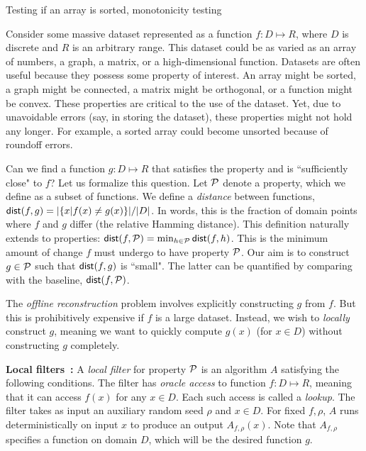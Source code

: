 \documentclass[natbib]{svcyclop}
\def\dist{{\sf dist}}
\begin{document}
\CrossRef

Testing if an array is sorted, monotonicity testing


\ProbDef

Consider some massive dataset represented as a function $f: D \mapsto R$,
where $D$ is discrete and $R$ is an arbitrary range.
This dataset could be as varied as an array of numbers, a graph, a matrix, or a high-dimensional function.
Datasets are often useful because they possess some 
property of interest. An array might be sorted, a graph might be 
connected, a matrix might be orthogonal, or a function might be convex. These properties are critical to the use
of the dataset. Yet, due to unavoidable errors (say, in storing the dataset), these
properties might not hold any longer. For example, a sorted array could become unsorted because of roundoff errors.

Can we find a function $g: D \mapsto R$ that satisfies the property and is ``sufficiently close"
to $f$? Let us formalize this question. Let $\mathcal{P}$ denote a property, which we define as a subset
of functions. We define a \emph{distance} between functions, $\dist(f,g) = |\{x | f(x) \neq g(x)\}|/|D|$. In words, this is the fraction
of domain points where $f$ and $g$ differ (the relative Hamming distance). This definition naturally extends to properties:
$\dist(f,\cP) = \min_{h \in \cP} \dist(f,h)$. This is the minimum amount of change $f$ must undergo to have property $\mathcal{P}$.
Our aim is to construct $g \in \mathcal{P}$ such that $\dist(f,g)$ is ``small". The latter can be quantified
by comparing with the baseline, $\dist(f,\cP)$.


The \emph{offline reconstruction} problem involves explicitly constructing $g$ from $f$.
But this is prohibitively expensive if $f$ is a large dataset. Instead, we wish to \emph{locally} construct $g$,
meaning we want to quickly compute $g(x)$ (for $x \in D$) without constructing $g$ completely.

{\bf Local filters~\cite{SS06}:} A {\em local filter} for property ${\cal P}$
is an algorithm $A$ satisfying the following conditions. The filter 
has \emph{oracle access} to function $f:D \mapsto R$, meaning that it can 
access $f(x)$ for any $x \in D$. Each such access is called a \emph{lookup}.
The filter takes
as input an auxiliary random seed $\rho$ and $x \in D$.  
For fixed $f, \rho$, $A$ runs deterministically on input $x$ to produce an output $A_{f,\rho}(x)$.
Note that $A_{f,\rho}$ specifies a function on domain $D$, which will be the desired function $g$.
\end{document}
